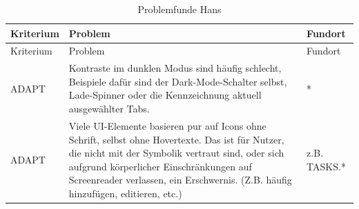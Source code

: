 \documentclass[
  12pt,
  ngerman,
  a4paper,
]{article}
\begin{document}
\begin{longtable}[]{@{}lll@{}}
\caption{Problemfunde Hans \label{tbl:heur:hans}}\tabularnewline
\toprule
\begin{minipage}[b]{0.22\columnwidth}\raggedright
Kriterium\strut
\end{minipage} & \begin{minipage}[b]{0.52\columnwidth}\raggedright
Problem\strut
\end{minipage} & \begin{minipage}[b]{0.17\columnwidth}\raggedright
Fundort\strut
\end{minipage}\tabularnewline
\midrule
\endfirsthead
\toprule
\begin{minipage}[b]{0.22\columnwidth}\raggedright
Kriterium\strut
\end{minipage} & \begin{minipage}[b]{0.52\columnwidth}\raggedright
Problem\strut
\end{minipage} & \begin{minipage}[b]{0.17\columnwidth}\raggedright
Fundort\strut
\end{minipage}\tabularnewline
\midrule
\endhead
\begin{minipage}[t]{0.22\columnwidth}\raggedright
ADAPT\strut
\end{minipage} & \begin{minipage}[t]{0.52\columnwidth}\raggedright
Kontraste im dunklen Modus sind häufig schlecht, Beispiele dafür sind
der Dark-Mode-Schalter selbst, Lade-Spinner oder die Kennzeichnung
aktuell ausgewählter Tabs.\strut
\end{minipage} & \begin{minipage}[t]{0.17\columnwidth}\raggedright
*\strut
\end{minipage}\tabularnewline
\begin{minipage}[t]{0.22\columnwidth}\raggedright
ADAPT\strut
\end{minipage} & \begin{minipage}[t]{0.52\columnwidth}\raggedright
Viele UI-Elemente basieren pur auf Icons ohne Schrift, selbst ohne
Hovertexte. Das ist für Nutzer, die nicht mit der Symbolik vertraut
sind, oder sich aufgrund körperlicher Einschränkungen auf Screenreader
verlassen, ein Erschwernis. (Z.B. häufig hinzufügen, editieren,
etc.)\strut
\end{minipage} & \begin{minipage}[t]{0.17\columnwidth}\raggedright
z.B. TASKS.*\strut
\end{minipage}\tabularnewline

\end{longtable}
\end{document}
